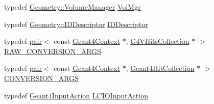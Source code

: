 \begin{DoxyCompactItemize}
\item 
typedef \hyperlink{class_d_d4hep_1_1_geometry_1_1_volume_manager}{Geometry::VolumeManager} \hyperlink{namespace_d_d4hep_1_1_simulation_a989cbf131f431a9856bcfd4ecd78c39f}{VolMgr}
\item 
typedef \hyperlink{class_d_d4hep_1_1_geometry_1_1_i_d_descriptor}{Geometry::IDDescriptor} \hyperlink{namespace_d_d4hep_1_1_simulation_a5f50c11f1a261ca45bb2e86ea6621083}{IDDescriptor}
\item 
typedef \hyperlink{classstd_1_1pair}{pair}$<$ const \hyperlink{class_d_d4hep_1_1_simulation_1_1_geant4_context}{Geant4Context} $\ast$, \hyperlink{class_g4_v_hits_collection}{G4VHitsCollection} $\ast$ $>$ \hyperlink{namespace_d_d4hep_1_1_simulation_a9202b8807ca8dc9a21546a337d2fbc83}{RAW\_\-CONVERSION\_\-ARGS}
\item 
typedef \hyperlink{classstd_1_1pair}{pair}$<$ const \hyperlink{class_d_d4hep_1_1_simulation_1_1_geant4_context}{Geant4Context} $\ast$, \hyperlink{class_d_d4hep_1_1_simulation_1_1_geant4_hit_collection}{Geant4HitCollection} $\ast$ $>$ \hyperlink{namespace_d_d4hep_1_1_simulation_a8700b6db44e003d9cf53ec35933063dc}{CONVERSION\_\-ARGS}
\item 
typedef \hyperlink{class_d_d4hep_1_1_simulation_1_1_geant4_input_action}{Geant4InputAction} \hyperlink{namespace_d_d4hep_1_1_simulation_a1e6fc5fffc58682e1f7cfb8baa1f0987}{LCIOInputAction}
\end{DoxyCompactItemize}
